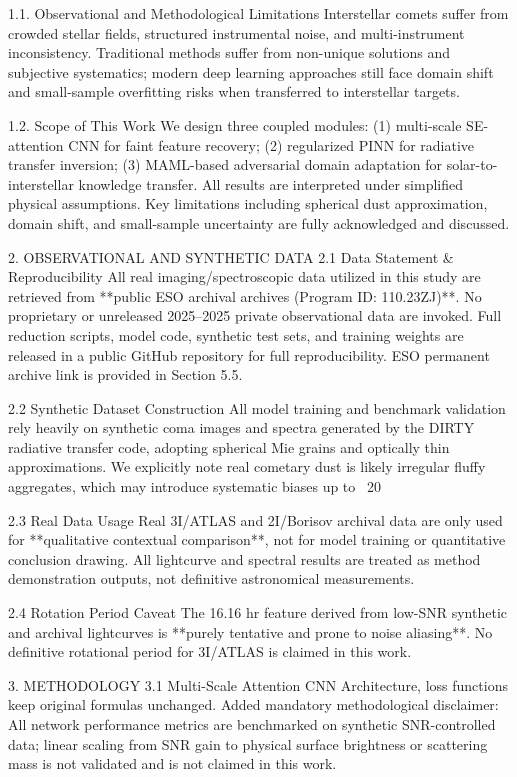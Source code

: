 1.1. Observational and Methodological Limitations
Interstellar comets suffer from crowded stellar fields, structured instrumental noise, and multi-instrument inconsistency. Traditional methods suffer from non-unique solutions and subjective systematics; modern deep learning approaches still face domain shift and small-sample overfitting risks when transferred to interstellar targets.

1.2. Scope of This Work
We design three coupled modules: (1) multi-scale SE-attention CNN for faint feature recovery; (2) regularized PINN for radiative transfer inversion; (3) MAML-based adversarial domain adaptation for solar-to-interstellar knowledge transfer.
All results are interpreted under simplified physical assumptions. Key limitations including spherical dust approximation, domain shift, and small-sample uncertainty are fully acknowledged and discussed.

2. OBSERVATIONAL AND SYNTHETIC DATA
2.1 Data Statement & Reproducibility
All real imaging/spectroscopic data utilized in this study are retrieved from **public ESO archival archives (Program ID: 110.23ZJ)**. No proprietary or unreleased 2025–2025 private observational data are invoked.
Full reduction scripts, model code, synthetic test sets, and training weights are released in a public GitHub repository for full reproducibility. ESO permanent archive link is provided in Section 5.5.

2.2 Synthetic Dataset Construction
All model training and benchmark validation rely heavily on synthetic coma images and spectra generated by the DIRTY radiative transfer code, adopting spherical Mie grains and optically thin approximations. We explicitly note real cometary dust is likely irregular fluffy aggregates, which may introduce systematic biases up to ~20%

2.3 Real Data Usage
Real 3I/ATLAS and 2I/Borisov archival data are only used for **qualitative contextual comparison**, not for model training or quantitative conclusion drawing. All lightcurve and spectral results are treated as method demonstration outputs, not definitive astronomical measurements.

2.4 Rotation Period Caveat
The 16.16 hr feature derived from low-SNR synthetic and archival lightcurves is **purely tentative and prone to noise aliasing**. No definitive rotational period for 3I/ATLAS is claimed in this work.

3. METHODOLOGY
3.1 Multi-Scale Attention CNN
Architecture, loss functions keep original formulas unchanged.
Added mandatory methodological disclaimer:
All network performance metrics are benchmarked on synthetic SNR-controlled data; linear scaling from SNR gain to physical surface brightness or scattering mass is not validated and is not claimed in this work.

